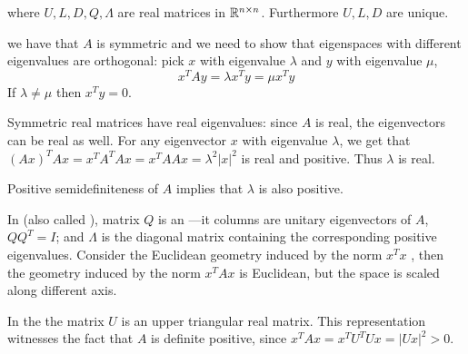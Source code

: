 \documentclass[a4paper,twoside,justified]{tufte-handout}
\begin{document}
where $ U,L,D,Q,\Lambda $ are real matrices in $ \mathbb{R}^{n\times n}
$. Furthermore $ U,L,D $ are unique.

\begin{marginfigure}
   we have that $A$ is symmetric
  and we need to show that eigenspaces with different eigenvalues are
  orthogonal: pick $ x $ with eigenvalue $ \lambda $ and $ y $ with
  eigenvalue $ \mu $,
  \begin{equation}
   x^{T} A y = \lambda x^{T} y = \mu x^{T}y
  \end{equation}
  If $ \lambda \not=\mu $ then $ x^{T}y=0 $.

  Symmetric real matrices have real eigenvalues: since $A$ is real,
  the eigenvectors can be real as well. For any eigenvector $
  x $ with eigenvalue $ \lambda $, we get that $ (Ax)^{T} Ax = x^{T}
  A^{T} A x = x^{T} A A x = \lambda^{2} |x|^{2}$ is real and
  positive. Thus $ \lambda $ is real.

  Positive semidefiniteness of $ A $ implies that $ \lambda $ is also
  positive.
\end{marginfigure}
%


In  (also called
), matrix $ Q $ is an
---it columns are unitary eigenvectors
of $ A $, \ie $ QQ^{T} = I$; and $ \Lambda $ is the diagonal matrix
containing the corresponding positive eigenvalues.
%
Consider the Euclidean geometry induced by the norm $ x^{T}x $ , then
the geometry induced by the norm $ x^{T}A x$ is Euclidean,
but the space is scaled along different axis.

In the  the matrix $ U $ is an
upper triangular real matrix. This representation witnesses the fact
that $ A $ is definite positive, since $ x^{T}A x = x^{T}U^{T}U x =
|Ux|^{2} > 0 $.
\end{document}
